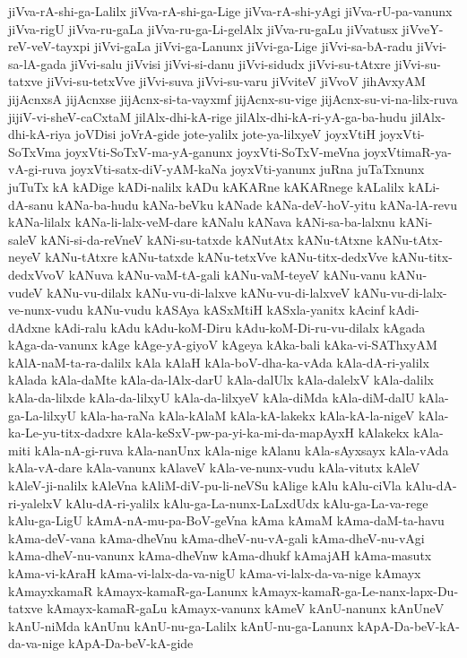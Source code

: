 {jiVva-rA-shi-ga-Lalilx
jiVva-rA-shi-ga-Lige
jiVva-rA-shi-yAgi
jiVva-rU-pa-vanunx
jiVva-rigU
jiVva-ru-gaLa
jiVva-ru-ga-Li-gelAlx
jiVva-ru-gaLu
jiVvatusx
jiVveY-reV-veV-tayxpi
jiVvi-gaLa
jiVvi-ga-Lanunx
jiVvi-ga-Lige
jiVvi-sa-bA-radu
jiVvi-sa-lA-gada
jiVvi-salu
jiVvisi
jiVvi-si-danu
jiVvi-sidudx
jiVvi-su-tAtxre
jiVvi-su-tatxve
jiVvi-su-tetxVve
jiVvi-suva
jiVvi-su-varu
jiVviteV
jiVvoV
jihAvxyAM
jijAcnxsA
jijAcnxse
jijAcnx-si-ta-vayxmf
jijAcnx-su-vige
jijAcnx-su-vi-na-lilx-ruva
jijiV-vi-sheV-caCxtaM
jilAlx-dhi-kA-rige
jilAlx-dhi-kA-ri-yA-ga-ba-hudu
jilAlx-dhi-kA-riya
joVDisi
joVrA-gide
jote-yalilx
jote-ya-lilxyeV
joyxVtiH
joyxVti-SoTxVma
joyxVti-SoTxV-ma-yA-ganunx
joyxVti-SoTxV-meVna
joyxVtimaR-ya-vA-gi-ruva
joyxVti-satx-diV-yAM-kaNa
joyxVti-yanunx
juRna
juTaTxnunx
juTuTx
kA
kADige
kADi-nalilx
kADu
kAKARne
kAKARnege
kALalilx
kALi-dA-sanu
kANa-ba-hudu
kANa-beVku
kANade
kANa-deV-hoV-yitu
kANa-lA-revu
kANa-lilalx
kANa-li-lalx-veM-dare
kANalu
kANava
kANi-sa-ba-lalxnu
kANi-saleV
kANi-si-da-reVneV
kANi-su-tatxde
kANutAtx
kANu-tAtxne
kANu-tAtx-neyeV
kANu-tAtxre
kANu-tatxde
kANu-tetxVve
kANu-titx-dedxVve
kANu-titx-dedxVvoV
kANuva
kANu-vaM-tA-gali
kANu-vaM-teyeV
kANu-vanu
kANu-vudeV
kANu-vu-dilalx
kANu-vu-di-lalxve
kANu-vu-di-lalxveV
kANu-vu-di-lalx-ve-nunx-vudu
kANu-vudu
kASAya
kASxMtiH
kASxla-yanitx
kAcinf
kAdi-dAdxne
kAdi-ralu
kAdu
kAdu-koM-Diru
kAdu-koM-Di-ru-vu-dilalx
kAgada
kAga-da-vanunx
kAge
kAge-yA-giyoV
kAgeya
kAka-bali
kAka-vi-SAThxyAM
kAlA-naM-ta-ra-dalilx
kAla
kAlaH
kAla-boV-dha-ka-vAda
kAla-dA-ri-yalilx
kAlada
kAla-daMte
kAla-da-lAlx-darU
kAla-dalUlx
kAla-dalelxV
kAla-dalilx
kAla-da-lilxde
kAla-da-lilxyU
kAla-da-lilxyeV
kAla-diMda
kAla-diM-dalU
kAla-ga-La-lilxyU
kAla-ha-raNa
kAla-kAlaM
kAla-kA-lakekx
kAla-kA-la-nigeV
kAla-ka-Le-yu-titx-dadxre
kAla-keSxV-pw-pa-yi-ka-mi-da-mapAyxH
kAlakekx
kAla-miti
kAla-nA-gi-ruva
kAla-nanUnx
kAla-nige
kAlanu
kAla-sAyxsayx
kAla-vAda
kAla-vA-dare
kAla-vanunx
kAlaveV
kAla-ve-nunx-vudu
kAla-vitutx
kAleV
kAleV-ji-nalilx
kAleVna
kAliM-diV-pu-li-neVSu
kAlige
kAlu
kAlu-ciVla
kAlu-dA-ri-yalelxV
kAlu-dA-ri-yalilx
kAlu-ga-La-nunx-LaLxdUdx
kAlu-ga-La-va-rege
kAlu-ga-LigU
kAmA-nA-mu-pa-BoV-geVna
kAma
kAmaM
kAma-daM-ta-havu
kAma-deV-vana
kAma-dheVnu
kAma-dheV-nu-vA-gali
kAma-dheV-nu-vAgi
kAma-dheV-nu-vanunx
kAma-dheVnw
kAma-dhukf
kAmajAH
kAma-masutx
kAma-vi-kAraH
kAma-vi-lalx-da-va-nigU
kAma-vi-lalx-da-va-nige
kAmayx
kAmayxkamaR
kAmayx-kamaR-ga-Lanunx
kAmayx-kamaR-ga-Le-nanx-lapx-Du-tatxve
kAmayx-kamaR-gaLu
kAmayx-vanunx
kAmeV
kAnU-nanunx
kAnUneV
kAnU-niMda
kAnUnu
kAnU-nu-ga-Lalilx
kAnU-nu-ga-Lanunx
kApA-Da-beV-kA-da-va-nige
kApA-Da-beV-kA-gide
}
